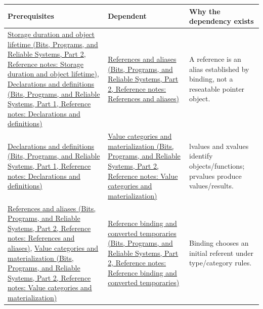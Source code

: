 {\def\LTcaptype{none} %
\begin{longtable}[]{@{}
  >{\raggedright\arraybackslash}p{}
  >{\raggedright\arraybackslash}p{}
  >{\raggedright\arraybackslash}p{}@{}}
\toprule\noalign{}
\begin{minipage}[b]{\linewidth}\raggedright
Prerequisites
\end{minipage} & \begin{minipage}[b]{\linewidth}\raggedright
Dependent
\end{minipage} & \begin{minipage}[b]{\linewidth}\raggedright
Why the dependency exists
\end{minipage} \\
\midrule\noalign{}
\endhead
\bottomrule\noalign{}
\endlastfoot
\href{../01-Bits-Programs-and-Reliable-Systems-P02/main.pdf\#nameddest=appendix-0b104bcba06b}{Storage duration and object lifetime (Bits, Programs, and Reliable Systems, Part 2, Reference notes: Storage duration and object lifetime)}, \href{../01-Bits-Programs-and-Reliable-Systems-P01/main.pdf\#nameddest=appendix-2e4d494c2d94}{Declarations and definitions (Bits, Programs, and Reliable Systems, Part 1, Reference notes: Declarations and definitions)} & \href{../01-Bits-Programs-and-Reliable-Systems-P02/main.pdf\#nameddest=appendix-d6d562ca9fbb}{References and aliases (Bits, Programs, and Reliable Systems, Part 2, Reference notes: References and aliases)} & A reference is an alias established by binding, not a reseatable pointer object. \\
\href{../01-Bits-Programs-and-Reliable-Systems-P01/main.pdf\#nameddest=appendix-2e4d494c2d94}{Declarations and definitions (Bits, Programs, and Reliable Systems, Part 1, Reference notes: Declarations and definitions)} & \href{../01-Bits-Programs-and-Reliable-Systems-P02/main.pdf\#nameddest=appendix-1121b30eaeb0}{Value categories and materialization (Bits, Programs, and Reliable Systems, Part 2, Reference notes: Value categories and materialization)} & lvalues and xvalues identify objects/functions; prvalues produce values/results. \\
\href{../01-Bits-Programs-and-Reliable-Systems-P02/main.pdf\#nameddest=appendix-d6d562ca9fbb}{References and aliases (Bits, Programs, and Reliable Systems, Part 2, Reference notes: References and aliases)}, \href{../01-Bits-Programs-and-Reliable-Systems-P02/main.pdf\#nameddest=appendix-1121b30eaeb0}{Value categories and materialization (Bits, Programs, and Reliable Systems, Part 2, Reference notes: Value categories and materialization)} & \href{../01-Bits-Programs-and-Reliable-Systems-P02/main.pdf\#nameddest=appendix-37856d997bb0}{Reference binding and converted temporaries (Bits, Programs, and Reliable Systems, Part 2, Reference notes: Reference binding and converted temporaries)} & Binding chooses an initial referent under type/category rules. \\

\end{longtable}}
